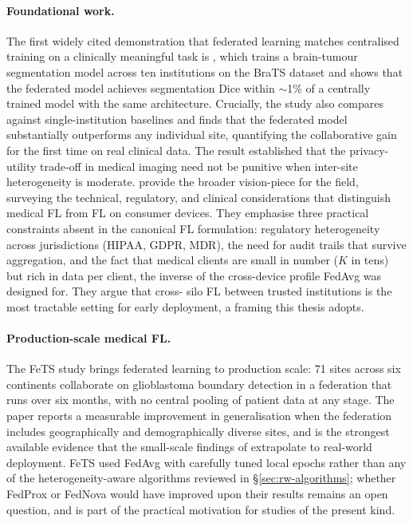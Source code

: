 \documentclass[11pt,a4paper]{article}
\begin{document}
\paragraph{Foundational work.}
The first widely cited demonstration that federated learning matches
centralised training on a clinically meaningful task is
\citet{sheller2020medicalfl}, which trains a brain-tumour segmentation
model across ten institutions on the BraTS dataset and shows that the
federated model achieves segmentation Dice within $\sim$1\% of a centrally
trained model with the same architecture. Crucially, the study also
compares against single-institution baselines and finds that the federated
model substantially outperforms any individual site, quantifying the
collaborative gain for the first time on real clinical data. The result
established that the privacy-utility trade-off in medical imaging need not
be punitive when inter-site heterogeneity is moderate.
\citet{rieke2020future} provide the broader vision-piece for the field,
surveying the technical, regulatory, and clinical considerations that
distinguish medical FL from FL on consumer devices. They emphasise three
practical constraints absent in the canonical FL formulation: regulatory
heterogeneity across jurisdictions (HIPAA, GDPR, MDR), the need for audit
trails that survive aggregation, and the fact that medical clients are
small in number ($K$ in tens) but rich in data per client, the inverse of
the cross-device profile FedAvg was designed for. They argue that cross-
silo FL between trusted institutions is the most tractable setting for
early deployment, a framing this thesis adopts.

\paragraph{Production-scale medical FL.}
The FeTS study \citep{pati2022fets} brings federated learning to production
scale: 71 sites across six continents collaborate on glioblastoma boundary
detection in a federation that runs over six months, with no central pooling
of patient data at any stage. The paper reports a measurable improvement in
generalisation when the federation includes geographically and demographically
diverse sites, and is the strongest available evidence that the
small-scale findings of \citet{sheller2020medicalfl} extrapolate to
real-world deployment. FeTS used FedAvg with carefully tuned local epochs
rather than any of the heterogeneity-aware algorithms reviewed in
\S\ref{sec:rw-algorithms}; whether FedProx or FedNova would have improved
upon their results remains an open question, and is part of the practical
motivation for studies of the present kind.
\end{document}
